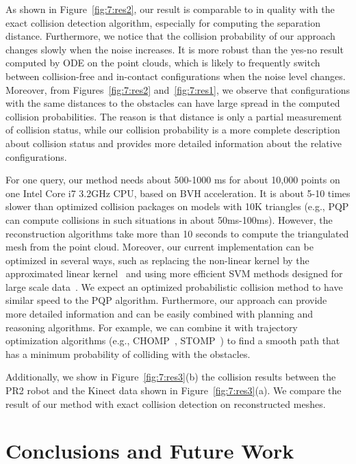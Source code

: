 As shown in Figure~\ref{fig:7:res2}, our result is comparable to in quality with the exact collision detection algorithm, especially for computing the separation distance. Furthermore, we notice that the collision probability of our approach changes slowly when the noise increases. It is more robust than the yes-no result computed by ODE on the point clouds, which is likely to frequently switch between collision-free and in-contact configurations when the noise level changes.
Moreover, from Figures~\ref{fig:7:res2} and~\ref{fig:7:res1}, we observe that configurations with the same distances to the obstacles can have large spread in the computed collision probabilities. The reason is that distance is only a partial measurement of collision status, while our collision probability is a more complete description about collision status and provides more detailed information about the relative configurations.

For one query, our method needs about 500-1000 ms for about 10,000 points on one Intel Core i7 3.2GHz CPU, based on BVH acceleration. It is about 5-10 times slower than optimized collision packages on models with 10K triangles (e.g., PQP can compute collisions in such situations in about 50ms-100ms). However, the reconstruction algorithms take more than 10 seconds to compute the triangulated mesh from the point cloud. Moreover, our current implementation can be optimized in several ways, such as replacing the non-linear kernel by the approximated linear kernel~\cite{Ali:nips:2007} and using more efficient SVM methods designed for large scale data~\cite{Fan:2008:LLL}. We expect an optimized probabilistic collision method to have similar speed to the PQP algorithm. Furthermore, our approach can provide more detailed information and can be easily combined with planning and reasoning algorithms. For example, we can combine it with trajectory optimization algorithms (e.g., CHOMP~\cite{Ratliff:2009}, STOMP~\cite{Mrinal:2011}) to find a smooth path that has a minimum probability of colliding with the obstacles.

Additionally, we show in Figure~\ref{fig:7:res3}(b) the collision results between the PR2 robot and the Kinect data shown in Figure~\ref{fig:7:res3}(a). We compare the result of our method with exact collision detection on reconstructed meshes.





\section{Conclusions and Future Work}

